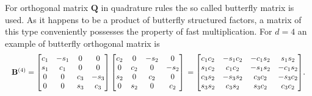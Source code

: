 For orthogonal matrix $\mathbf{Q}$ in quadrature rules the so called butterfly matrix is used.
As it happens to be a product of butterfly structured factors, a matrix of this type conveniently possesses the property of fast multiplication. For ${d = 4}$ an example of butterfly orthogonal matrix is
\begin{equation*}\resizebox{.99\hsize}{!}{$
    \mathbf{B}^{(4)} =
    \begin{bmatrix}
        c_1 & -s_1 & 0 & 0 \\
        s_1 & c_1 & 0 & 0 \\
        0 & 0 & c_3 & -s_3 \\
        0 & 0 & s_3 & c_3 \\
    \end{bmatrix}
    \begin{bmatrix}
        c_2 & 0 & -s_2 & 0 \\
        0 & c_2 & 0 & -s_2 \\
        s_2 & 0 & c_2 & 0 \\
        0 & s_2 & 0 & c_2 \\
    \end{bmatrix}\\
    =
    \begin{bmatrix}
        c_1c_2 & -s_1c_2 & -c_1s_2 & s_1s_2 \\
        s_1c_2 & c_1c_2 & -s_1s_2 & -c_1s_2 \\
        c_3s_2 & -s_3s_2 & c_3c_2 & -s_3c_2 \\
        s_3s_2 & c_3s_2 & s_3c_2 & c_3c_2 \\
    \end{bmatrix}$}.
\end{equation*}

